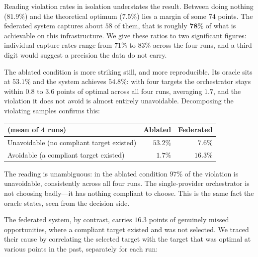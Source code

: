 \documentclass[conference]{IEEEtran}
\begin{document}
Reading violation rates in isolation understates the result. Between doing
nothing ($81.9\%$) and the theoretical optimum ($7.5\%$) lies a margin of
some $74$ points. The federated system captures about $58$ of them, that is
roughly $\mathbf{78\%}$ of what is achievable on this infrastructure. We give
these ratios to two significant figures: individual capture rates range from
$71\%$ to $83\%$ across the four runs, and a third digit would suggest a
precision the data do not carry.

The ablated condition is more striking still, and more reproducible. Its
oracle sits at $53.1\%$ and the system achieves $54.8\%$: with four targets
the orchestrator stays within $0.8$ to $3.6$ points of optimal across all
four runs, averaging $1.7$, and the violation it does not avoid is almost
entirely unavoidable. Decomposing the violating samples confirms this:

\begin{center}
\footnotesize
\begin{tabular}{@{}lrr@{}}
\toprule
(mean of 4 runs) & \textbf{Ablated} & \textbf{Federated}\\
\midrule
Unavoidable (no compliant target existed) & $53.2\%$ & $7.6\%$\\
Avoidable (a compliant target existed)    & $1.7\%$  & $16.3\%$\\
\bottomrule
\end{tabular}
\end{center}

The reading is unambiguous: in the ablated condition $97\%$ of the violation
is unavoidable, consistently across all four runs. The single-provider
orchestrator is not choosing badly---it has nothing compliant to choose. This
is the same fact the oracle states, seen from the decision side.

The federated system, by contrast, carries $16.3$ points of genuinely missed
opportunities, where a compliant target existed and was not selected. We
traced their cause by correlating the selected target with the target that
was optimal at various points in the past, separately for each run:
\end{document}
